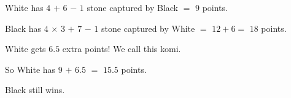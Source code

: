 \documentclass[a4paper,12pt]{extarticle}
\begin{document}
\begin{center}
  {\Large White has \ul{$4$} $+$ \ul{$6$} $-$ \ul{$1$} stone captured by Black $=$ \ul{$9$} points.

    Black has \ul{$4$} $\times$ \ul{$3$} $+$ \ul{$7$} $-$ \ul{$1$} stone captured by White $=$ $12 + 6 =$ \ul{$18$} points.
  }

  \vspace{0.25cm}
  
  {\Large White gets $6.5$ extra points! We call this komi.

  So White has \ul{$9$} $+$ \ul{$6.5$} $=$ \ul{$15.5$} points.

  Black still wins.}


  



\end{center}
\end{document}
